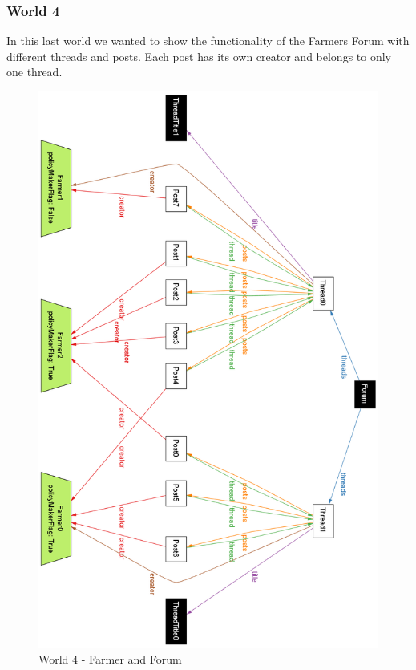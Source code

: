\subsubsection{World 4}
In this last world we wanted to show the functionality of the Farmers Forum with different threads and posts. Each post has its own creator and belongs to only one thread.
\begin{figure}[H]
\centering
\includegraphics[scale=0.37]{../AlloyCode/ExportWorldPNG/world4_farmer_forum.png}
\caption{\label{fig:alloyExecution}World 4 - Farmer and Forum}
\end{figure}
